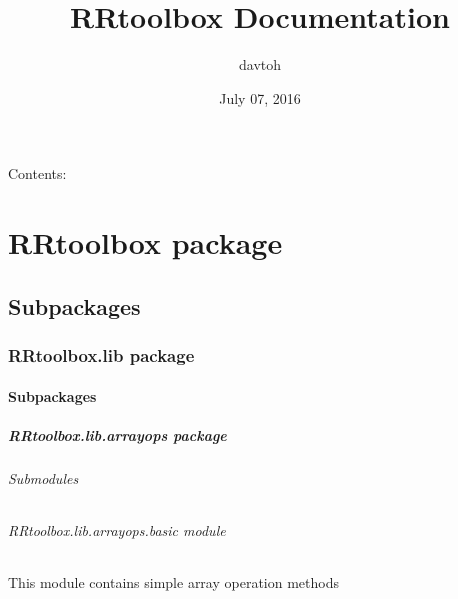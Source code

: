 \documentclass[letterpaper,10pt,english]{sphinxmanual}
\title{RRtoolbox Documentation}
\date{July 07, 2016}
\author{davtoh}
\begin{document}
\maketitle
\tableofcontents
{}\label{index::doc}


Contents:


\chapter{RRtoolbox package}
\label{RRtoolbox::doc}\label{RRtoolbox:welcome-to-rrtoolbox-s-documentation}\label{RRtoolbox:rrtoolbox-package}

\section{Subpackages}
\label{RRtoolbox:subpackages}

\subsection{RRtoolbox.lib package}
\label{RRtoolbox.lib:rrtoolbox-lib-package}\label{RRtoolbox.lib::doc}

\subsubsection{Subpackages}
\label{RRtoolbox.lib:subpackages}

\paragraph{RRtoolbox.lib.arrayops package}
\label{RRtoolbox.lib.arrayops:rrtoolbox-lib-arrayops-package}\label{RRtoolbox.lib.arrayops::doc}

\subparagraph{Submodules}
\label{RRtoolbox.lib.arrayops:submodules}

\subparagraph{RRtoolbox.lib.arrayops.basic module}
\label{RRtoolbox.lib.arrayops:rrtoolbox-lib-arrayops-basic-module}\label{RRtoolbox.lib.arrayops:module-RRtoolbox.lib.arrayops.basic}
This module contains simple array operation methods
\end{document}
